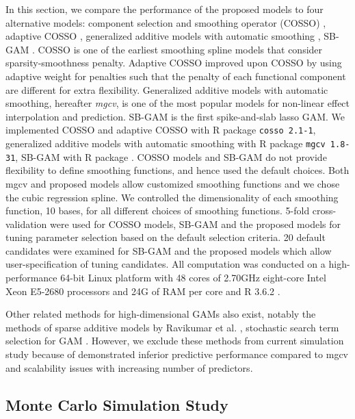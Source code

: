 \documentclass[AMA,STIX1COL,]{WileyNJD-v2}
\begin{document}
In this section, we compare the performance of the proposed models to
four alternative models: component selection and smoothing operator
(COSSO) \citep{Zhang2006GAM}, adaptive COSSO \citep{Storlie2011},
generalized additive models with automatic smoothing \citep{Wood2011},
SB-GAM \citep{Bai2021}. COSSO is one of the earliest smoothing spline
models that consider sparsity-smoothness penalty. Adaptive COSSO
improved upon COSSO by using adaptive weight for penalties such that the
penalty of each functional component are different for extra
flexibility. Generalized additive models with automatic smoothing,
hereafter \textit{mgcv}, is one of the most popular models for
non-linear effect interpolation and prediction. SB-GAM is the first
spike-and-slab lasso GAM. We implemented COSSO and adaptive COSSO with R
package \texttt{cosso 2.1-1}, generalized additive models with automatic
smoothing with R package \texttt{mgcv 1.8-31}, SB-GAM with R package
. COSSO models and SB-GAM do not provide flexibility
to define smoothing functions, and hence used the default choices. Both
mgcv and proposed models allow customized smoothing functions and we
chose the cubic regression spline. We controlled the dimensionality of
each smoothing function, 10 bases, for all different choices of
smoothing functions. 5-fold cross-validation were used for COSSO models,
SB-GAM and the proposed models for tuning parameter selection based on
the default selection criteria. 20 default candidates were examined for
SB-GAM and the proposed models which allow user-specification of tuning
candidates. All computation was conducted on a high-performance 64-bit
Linux platform with 48 cores of 2.70GHz eight-core Intel Xeon E5-2680
processors and 24G of RAM per core and R 3.6.2 \citep{R}.

Other related methods for high-dimensional GAMs also exist, notably the
methods of sparse additive models by Ravikumar et al.
\citep{Ravikumar2009}, stochastic search term selection for GAM
\citep{Scheipl2012}. However, we exclude these methods from current
simulation study because of demonstrated inferior predictive performance
compared to mgcv and scalability issues with increasing number of
predictors. \citep{Scheipl2013}

\hypertarget{monte-carlo-simulation-study}{%
\subsection{Monte Carlo Simulation
Study}\label{monte-carlo-simulation-study}}
\end{document}
